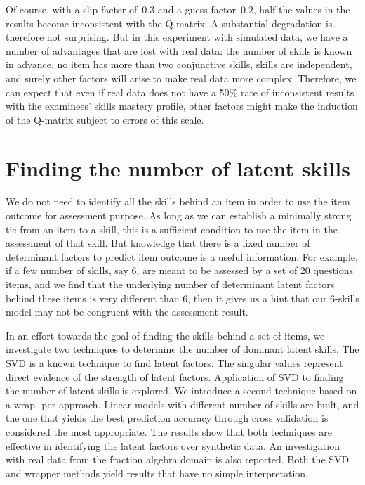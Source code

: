 Of course, with a slip factor of~$0.3$ and a guess factor~$0.2$, half the values in the results become inconsistent with the Q-matrix. A substantial degradation is therefore not surprising.  But in this experiment with simulated data, we have a number of advantages that are lost with real data: the number of skills is known in advance, no item has more than two conjunctive skills, skills are independent, and surely other factors will arise to make real data more complex.  Therefore, we can expect that even if real data does not have a 50\% rate of inconsistent results with the examinees' skills mastery profile, other factors might make the induction of the Q-matrix subject to errors of this scale.

\section{Finding the number of latent skills}
\label{EDM2012}

We do not need to identify all the skills behind an item in order to use the item outcome for assessment purpose. As long as we can establish a minimally strong tie from an item to a skill, this is a sufficient condition to use the item in the assessment of that skill. But knowledge that there is a fixed number of determinant factors to predict item outcome is a useful information. For example, if a few number of skills, say 6, are meant to be assessed by a set of 20 questions items, and we find that the underlying number of determinant latent factors behind these items is very different than 6, then it gives us a hint that our 6-skills model may not be congruent with the assessment result.

In an effort towards the goal of finding the skills behind a set of items, we investigate two techniques to determine the number of dominant latent skills. The SVD is a known technique to find latent factors. The singular values represent direct evidence of the strength of latent factors. Application of SVD to finding the number of latent skills is explored. We introduce a second technique based on a wrap- per approach. Linear models with different number of skills are built, and the one that yields the best prediction accuracy through cross validation is considered the most appropriate. The results show that both techniques are effective in identifying the latent factors over synthetic data. An investigation with real data from the fraction algebra domain is also reported. Both the SVD and wrapper methods yield results that have no simple interpretation.


